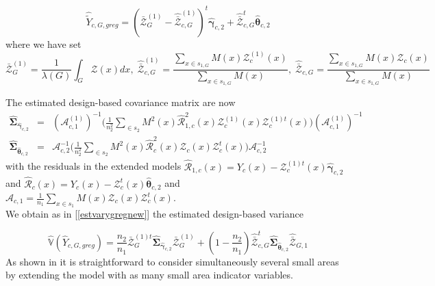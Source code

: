 \documentclass[a4paper,12pt,leqno, titlepage]{article}
\newcommand{\VAR}{\mathbb{V}}
\begin{document}
{{\begin{equation}\label{extclustersmallareaest1}
\hat{\tilde{Y}}_{c,G,greg}
= (\bar{\pmb{\mathcal{Z}}}_G^{(1)}-\hat{\bar{\pmb{\mathcal{Z}}}}_{c,G}^{(1)})^t\hat{\pmb{\gamma}}_{c,2} +
\hat{\bar{\pmb{\mathcal{Z}}}}_{c,G}^t\hat{\pmb{\theta}}_{c,2}
\end{equation}
where we have set
 $$\bar{\pmb{\mathcal{Z}}}_G^{(1)}=\frac{1}{\lambda(G)}\int_G \mathcal{Z}(x)dx,\; \hat{\bar{\pmb{\mathcal{Z}}}}_{c,G}^{(1)}=
 \frac{\sum_{x\in{s_{1,G}}}M(x)\pmb{\mathcal{Z}}_c^{(1)}(x)}{\sum_{x\in{s_{1,G}}}M(x)},\;
 \hat{\bar{\pmb{\mathcal{Z}}}}_{c,G}=
 \frac{\sum_{x\in{s_{1,G}}}M(x)\pmb{\mathcal{Z}}_c(x)}{\sum_{x\in{s_{1,G}}}M(x)}$$

The estimated design-based covariance matrix are now
\begin{eqnarray}\label{gammathetaclusterextestvar}
\hat{\pmb{\Sigma}}_{\hat{\pmb{\gamma}}_{c,2}}&=&
(\pmb{\mathcal{A}}^{(1)}_{c,1})^{-1}\Big(\frac{1}{n^2_2}\sum_{\in{s_2}}M^2(x)\hat{\mathcal{R}}_{1,c}^2(x)
\pmb{\mathcal{Z}}^{(1)}_c(x)\pmb{\mathcal{Z}}^{(1)t}_c(x)\Big)(\pmb{\mathcal{A}}^{(1)}_{c,1})^{-1}\nonumber \\
\hat{\pmb{\Sigma}}_{\hat{\pmb{\theta}}_{c,2}}&=&
\pmb{\mathcal{A}}^{-1}_{c,2}\Big(\frac{1}{n^2_2}\sum_{\in{s_2}}M^2(x)\hat{\mathcal{R}}_c^2(x)
\pmb{\mathcal{Z}}_c(x)\pmb{\mathcal{Z}}^t_c(x)\Big)\pmb{\mathcal{A}}^{-1}_{c,2}
\end{eqnarray}
with the residuals in the extended models $\hat{\mathcal{R}}_{1,c}(x)=Y_c(x)-\pmb{\mathcal{Z}}^{(1)t}_c(x)\hat{\pmb{\gamma}}_{c,2}$ and
$\hat{\mathcal{R}}_{c}(x)=Y_c(x)-\pmb{\mathcal{Z}}^{t}_c(x)\hat{\pmb{\theta}}_{c,2}$ and
$\pmb{\mathcal{A}}_{c,1}=\frac{1}{n_1}\sum_{x\in{s_1}}M(x)\pmb{\mathcal{Z}}_c(x)\pmb{\mathcal{Z}}^t_c(x)$.\\
We obtain as in [\ref{estvarygregnew}] the estimated design-based variance

\begin{equation}\label{extendedclustersmallestvariance}
\hat{\VAR}(\hat{Y}_{c,G,greg}) =\frac{n_2}{n_1}\bar{\pmb{\mathcal{Z}}}_G^{(1)t}\hat{\pmb{\Sigma}}_{\hat{\pmb{\gamma}}_{c,2}}
\bar{\pmb{\mathcal{Z}}}_G^{(1)}+(1-\frac{n_2}{n_1})\hat{\bar{\pmb{\mathcal{Z}}}}_{c,G}^t\hat{\pmb{\Sigma}}_{\hat{\pmb{\theta}}_{c,2}}
\hat{\bar{\pmb{\mathcal{Z}}}}_{G,1}
\end{equation}
As shown in \cite{mandallazreport1} it is straightforward to consider simultaneously several
small areas by extending the model with as many small area indicator variables.\\

}}
\end{document}
